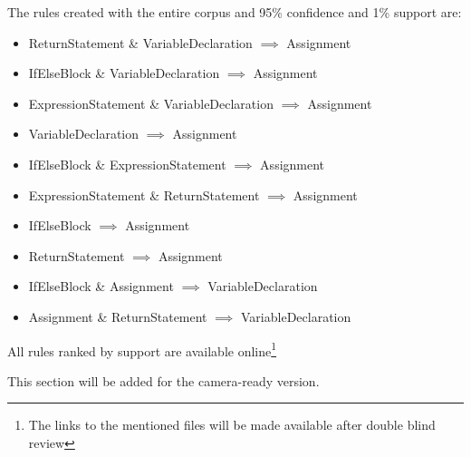 \documentclass[sigconf]{acmart}
\begin{document}
The rules created with the entire corpus and 95\% confidence and 1\% support are:
\begin{itemize}
 \item ReturnStatement \& VariableDeclaration $\implies$ Assignment
 \item IfElseBlock \& VariableDeclaration $\implies$ Assignment
 \item ExpressionStatement \& VariableDeclaration $\implies$ Assignment
 \item VariableDeclaration $\implies$ Assignment
 \item IfElseBlock \& ExpressionStatement $\implies$ Assignment
 \item ExpressionStatement \& ReturnStatement $\implies$ Assignment
 \item IfElseBlock $\implies$ Assignment
 \item ReturnStatement $\implies$ Assignment
 \item IfElseBlock \& Assignment $\implies$ VariableDeclaration
 \item Assignment \& ReturnStatement $\implies$ VariableDeclaration
 \end{itemize}
All rules ranked by support are available online\footnote{The links to the mentioned files 
will be made available after double blind review}

\begin{acks}
 This section will be added for the camera-ready version.

\end{acks}




\end{document}
